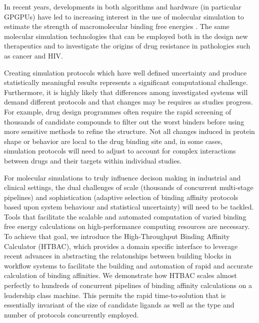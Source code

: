 In recent years, developments in both algorithms and hardware (in particular 
GPGPUs) have led to increasing interest in the use of molecular simulation to 
estimate the strength of macromolecular binding free energies \cite{DeVivo2016}. 
The same molecular simulation technologies that can be employed both in the
design new therapeutics and to investigate the origins of drug resistance in 
pathologies such as cancer and HIV. 

Creating simulation protocols which have well defined uncertainty and produce
statistically meaningful results represents a significant computational challenge. 
Furthermore, it is highly likely that differences among investigated systems will 
demand different protocols and that changes may be requires as studies progress. 
For example, drug design programmes often require the rapid screening of thousands 
of candidate compounds to filter out the worst binders before using more sensitive 
methods to refine the structure. 
Not all changes induced in protein shape or behavior are local to the drug binding 
site and, in some cases, simulation protocols will need to adjust to account for 
complex interactions between drugs and their targets within individual studies.

For molecular simulations to truly influence decison making in industrial and 
clinical settings, the dual challenges of
scale (thousands of concurrent multi-stage pipelines) and sophistication
(adaptive selection of binding affinity protocols based upon system behaviour and statistical uncertainty) will need to be tackled. 
Tools that facilitate the scalable and automated computation of varied binding 
free energy calculations on high-performance computing resources are necessary. 
To achieve that goal, we introduce the High-Throughput Binding Affinity Calculator 
(HTBAC), which provides a domain specific interface to leverage recent advances in abstracting 
the relatonships between building blocks in workflow systems to facilitate the building 
and automation of rapid and accurate calculation of binding affinities.
We demonstrate how HTBAC scales almost perfectly to hundreds of concurrent
pipelines of binding affinity calculations on a leadership class machine. 
This permits the rapid time-to-solution that is essentially invariant of the size
of candidate ligands as well as the type and number of protocols concurrently
employed.

